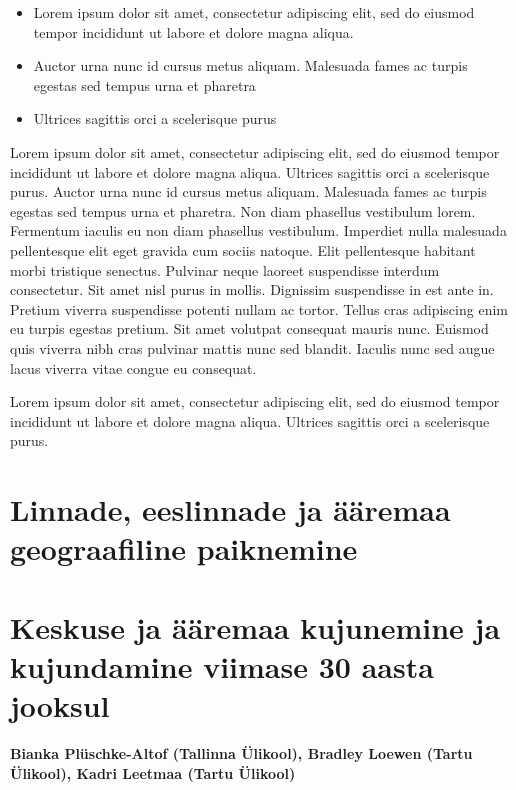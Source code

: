 \documentclass[]{book}
\begin{document}
\begin{points}
\begin{itemize}
\item
  Lorem ipsum dolor sit amet, consectetur adipiscing elit, sed do
  eiusmod tempor incididunt ut labore et dolore magna aliqua.
\item
  Auctor urna nunc id cursus metus aliquam. Malesuada fames ac turpis
  egestas sed tempus urna et pharetra
\item
  Ultrices sagittis orci a scelerisque purus
\end{itemize}
\end{points}

Lorem ipsum dolor sit amet, consectetur adipiscing elit, sed do eiusmod tempor incididunt ut labore et dolore magna aliqua. Ultrices sagittis orci a scelerisque purus. Auctor urna nunc id cursus metus aliquam. Malesuada fames ac turpis egestas sed tempus urna et pharetra. Non diam phasellus vestibulum lorem. Fermentum iaculis eu non diam phasellus vestibulum. Imperdiet nulla malesuada pellentesque elit eget gravida cum sociis natoque. Elit pellentesque habitant morbi tristique senectus. Pulvinar neque laoreet suspendisse interdum consectetur. Sit amet nisl purus in mollis. Dignissim suspendisse in est ante in. Pretium viverra suspendisse potenti nullam ac tortor. Tellus cras adipiscing enim eu turpis egestas pretium. Sit amet volutpat consequat mauris nunc. Euismod quis viverra nibh cras pulvinar mattis nunc sed blandit. Iaculis nunc sed augue lacus viverra vitae congue eu consequat.

\begin{blockquote}
Lorem ipsum dolor sit amet, consectetur adipiscing elit, sed do eiusmod
tempor incididunt ut labore et dolore magna aliqua. Ultrices sagittis
orci a scelerisque purus.
\end{blockquote}

\hypertarget{chapter22}{%
\section{Linnade, eeslinnade ja ääremaa geograafiline paiknemine}\label{chapter22}}

\hypertarget{chapter23}{%
\section{Keskuse ja ääremaa kujunemine ja kujundamine viimase 30 aasta jooksul}\label{chapter23}}

\begin{authors}
\textbf{Bianka Plüschke-Altof (Tallinna Ülikool), Bradley Loewen (Tartu
Ülikool), Kadri Leetmaa (Tartu Ülikool)}
\end{authors}
\end{document}
